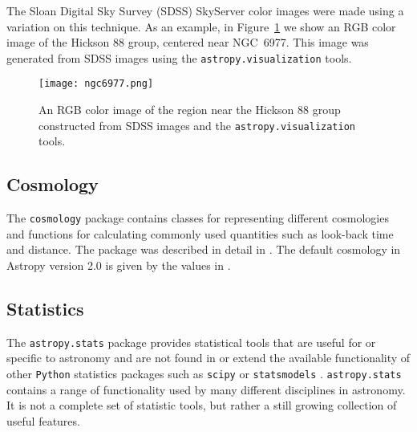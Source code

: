 \documentclass[modern]{aastex61}
\newcommand{\package}[1]{\texttt{#1}\xspace}
\newcommand{\python}{\package{Python}}
\newcommand{\astropy}{Astropy\xspace}
\renewcommand{\figurename}{Figure\xspace}
\begin{document}
The Sloan Digital Sky Survey (SDSS) SkyServer color images were made using a variation on this technique.  As an example, in \figurename~\ref{fig:ngc6977} we show an RGB color image of the Hickson 88 group, centered near NGC~6977.  This image was generated from SDSS images using the \package{astropy.visualization} tools.

\begin{figure}
\texttt{[image: ngc6977.png]}
\caption{An RGB color image of the region near the Hickson 88 group
constructed from SDSS images and the \package{astropy.visualization}
tools.
\label{fig:ngc6977}}
\end{figure}


\subsection{Cosmology}

The \package{cosmology} package contains classes for representing different cosmologies and functions for calculating commonly used quantities such as look-back time and distance.   The package was described in detail in \cite{astropy}.  The default cosmology in \astropy version 2.0 is given by the values in \cite{2016A&A...594A..13P}.

\subsection{Statistics}

The \package{astropy.stats} package provides statistical tools that
are useful for or specific to astronomy and are not found in or extend
the available functionality of other \python statistics packages such
as \package{scipy} \citep{scipy} or \package{statsmodels}
\citep{seabold2010statsmodels}.  \package{astropy.stats} contains
a range of functionality used by many different disciplines
in astronomy. It is not a complete set of statistic tools, but rather
a still growing collection of useful features.

\end{document}
